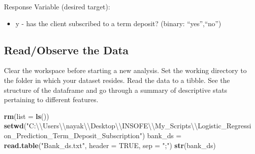 \documentclass[]{article}
\newenvironment{Shaded}{\begin{snugshade}}{\end{snugshade}}
\newcommand{\CharTok}[1]{\textcolor[rgb]{0.31,0.60,0.02}{#1}}
\newcommand{\DataTypeTok}[1]{\textcolor[rgb]{0.13,0.29,0.53}{#1}}
\newcommand{\KeywordTok}[1]{\textcolor[rgb]{0.13,0.29,0.53}{\textbf{#1}}}
\newcommand{\NormalTok}[1]{#1}
\newcommand{\OtherTok}[1]{\textcolor[rgb]{0.56,0.35,0.01}{#1}}
\newcommand{\StringTok}[1]{\textcolor[rgb]{0.31,0.60,0.02}{#1}}
\providecommand{\tightlist}{%
  \setlength{\itemsep}{0pt}\setlength{\parskip}{0pt}}
\begin{document}
Response Variable (desired target):

\begin{itemize}
\tightlist
\item
  y - has the client subscribed to a term deposit? (binary:
  ``yes'',``no'')
\end{itemize}

\hypertarget{readobserve-the-data}{%
\subsection{Read/Observe the Data}\label{readobserve-the-data}}

Clear the workspace before starting a new analysis. Set the working
directory to the folder in which your dataset resides. Read the data to
a tibble. See the structure of the dataframe and go through a summary of
descriptive stats pertaining to different features.

\begin{Shaded}
\begin{Highlighting}[]
\KeywordTok{rm}\NormalTok{(}\DataTypeTok{list =} \KeywordTok{ls}\NormalTok{())}
\KeywordTok{setwd}\NormalTok{(}\StringTok{"C:}\CharTok{\textbackslash{}\textbackslash{}}\StringTok{Users}\CharTok{\textbackslash{}\textbackslash{}}\StringTok{nayak}\CharTok{\textbackslash{}\textbackslash{}}\StringTok{Desktop}\CharTok{\textbackslash{}\textbackslash{}}\StringTok{INSOFE}\CharTok{\textbackslash{}\textbackslash{}}\StringTok{My_Scripts}\CharTok{\textbackslash{}\textbackslash{}}\StringTok{Logistic_Regression_Prediction_Term_Deposit_Subscription"}\NormalTok{)}
\NormalTok{bank_ds =}\StringTok{ }\KeywordTok{read.table}\NormalTok{(}\StringTok{"Bank_ds.txt"}\NormalTok{, }\DataTypeTok{header =} \OtherTok{TRUE}\NormalTok{, }\DataTypeTok{sep =} \StringTok{";"}\NormalTok{)}
\KeywordTok{str}\NormalTok{(bank_ds)}
\end{Highlighting}
\end{Shaded}
\end{document}
